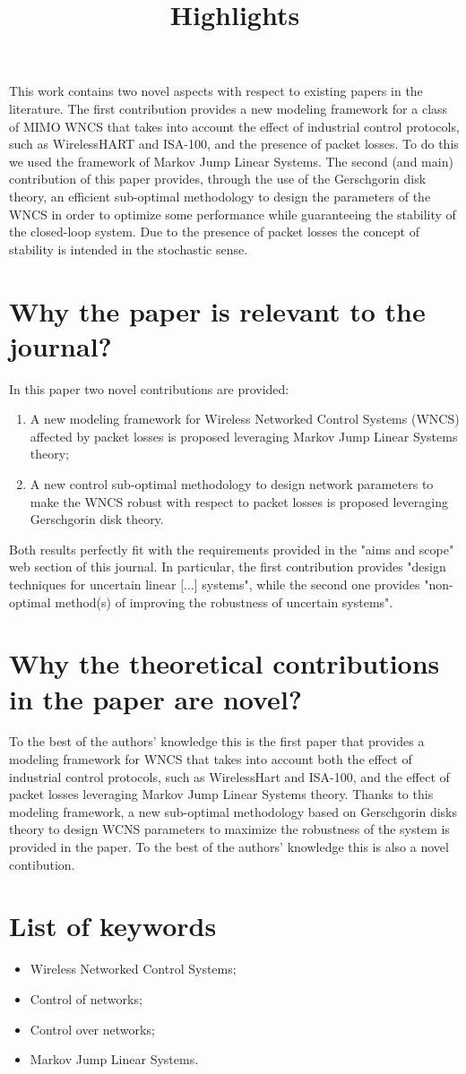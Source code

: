 \documentclass[12pt]{article}
\begin{document}
\title{Highlights}
\date{}
\maketitle 
\thispagestyle{empty}

This work contains two novel aspects with respect to existing papers in the literature. The first contribution provides a new modeling framework for a class of MIMO WNCS that takes into account the effect of industrial control protocols, such as WirelessHART and ISA-100, and the presence of packet losses. To do this we used the framework of Markov Jump Linear Systems. The second (and main) contribution of this paper provides, through the use of the Gerschgorin disk theory, an efficient sub-optimal methodology to design the parameters of the WNCS in order to optimize some performance while guaranteeing the stability of the closed-loop system. Due to the presence of packet losses the concept of stability is intended in the stochastic sense.

\section{Why the paper is relevant to the journal?}
In this paper two novel contributions are provided:
\begin{enumerate}
	\item A new modeling framework for Wireless Networked Control Systems (WNCS) affected by packet losses is proposed leveraging Markov Jump Linear Systems theory;
	\item A new control sub-optimal methodology to design network parameters to make the WNCS robust with respect to packet losses is proposed leveraging Gerschgorin disk theory.
\end{enumerate}
Both results perfectly fit with the requirements provided in the "aims and scope" web section of this journal. In particular, the first contribution provides "design techniques for uncertain linear [...] systems", while the second one provides "non-optimal method(s) of improving the robustness of uncertain systems".

\section{Why the theoretical contributions in the paper are novel?}
To the best of the authors' knowledge this is the first paper that provides a modeling framework for WNCS that takes into account both the effect of industrial control protocols, such as WirelessHart and ISA-100, and the effect of packet losses leveraging Markov Jump Linear Systems theory. Thanks to this modeling framework, a new sub-optimal methodology based on Gerschgorin disks theory to design WCNS parameters to maximize the robustness of the system is provided in the paper. To the best of the authors' knowledge this is also a novel contibution.

\section{List of keywords}
\begin{itemize}
	\item Wireless Networked Control Systems;
	\item Control of networks;
	\item Control over networks;
	\item Markov Jump Linear Systems.
\end{itemize}
\end{document}
